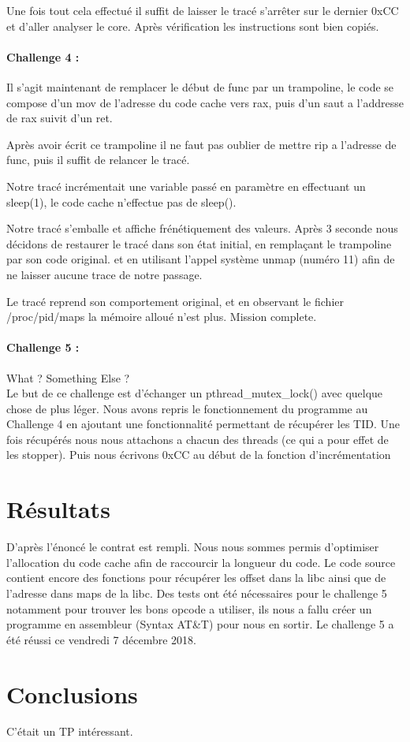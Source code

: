 \documentclass[12pt]{article}
\begin{document}
Une fois tout cela effectué il suffit de laisser le tracé s'arrêter sur le dernier 0xCC et d'aller analyser le core.
Après vérification les instructions sont bien copiés. 

\newpage

\paragraph{Challenge 4 :}

Il s'agit maintenant de remplacer le début de func par un trampoline, le code se compose d'un mov de l'adresse du code cache vers rax,
puis d'un saut a l'addresse de rax suivit d'un ret.

Après avoir écrit ce trampoline il ne faut pas oublier de mettre rip a l'adresse de func, puis il suffit de relancer le tracé.

Notre tracé incrémentait une variable passé en paramètre en effectuant un sleep(1), le code cache n'effectue pas de sleep().

Notre tracé s'emballe et affiche frénétiquement des valeurs.
Après 3 seconde nous décidons de restaurer le tracé dans son état initial, en remplaçant le trampoline par son code original. et en utilisant l'appel système unmap (numéro 11) afin de ne laisser aucune trace de notre passage.

Le tracé reprend son comportement original, et en observant le fichier /proc/pid/maps la mémoire alloué n'est plus.
Mission complete.

\paragraph{Challenge 5 :}

What ? Something Else ?\\
Le but de ce challenge est d'échanger un pthread\_mutex\_lock() avec quelque chose de plus léger.
Nous avons repris le fonctionnement du programme au Challenge 4 en ajoutant une fonctionnalité permettant de récupérer les TID.
Une fois récupérés nous nous attachons a chacun des threads (ce qui a pour effet de les stopper).
Puis nous écrivons 0xCC au début de la fonction d'incrémentation

\newpage

\section{Résultats}
D'après l'énoncé le contrat est rempli. Nous nous sommes permis d'optimiser l'allocation du code cache afin de raccourcir la longueur du code.
Le code source contient encore des fonctions pour récupérer les offset dans la libc ainsi que de l'adresse dans maps de la libc.
Des tests ont été nécessaires pour le challenge 5 notamment pour trouver les bons opcode a utiliser,
ils nous a fallu créer un programme en assembleur (Syntax AT\&T) pour nous en sortir.
Le challenge 5 a été réussi ce vendredi 7 décembre 2018.


\section{Conclusions}
C'était un TP intéressant.
\end{document}
